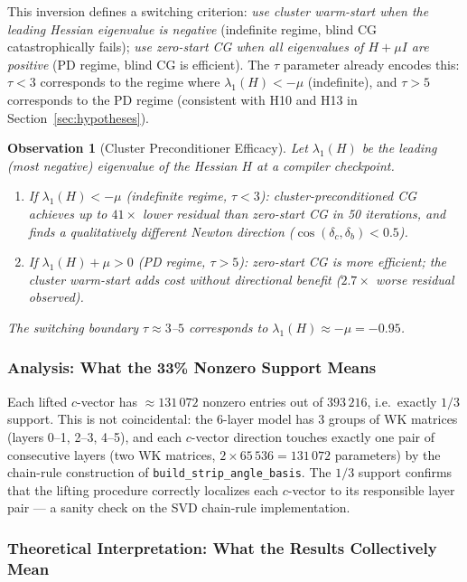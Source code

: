 \documentclass[11pt]{amsart}
\newtheorem{observation}[theorem]{Observation}
\begin{document}
This inversion defines a switching criterion:
\emph{use cluster warm-start when the leading Hessian eigenvalue
is negative} (indefinite regime, blind CG catastrophically fails);
\emph{use zero-start CG when all eigenvalues of $H + \mu I$ are positive}
(PD regime, blind CG is efficient).
The $\tau$ parameter already encodes this: $\tau < 3$ corresponds to
the regime where $\lambda_1(H) < -\mu$ (indefinite), and $\tau > 5$
corresponds to the PD regime (consistent with H10 and H13 in
Section~\ref{sec:hypotheses}).

\begin{observation}[Cluster Preconditioner Efficacy]
\label{thm:cluster_precond}
Let $\lambda_1(H)$ be the leading (most negative) eigenvalue of the
Hessian $H$ at a compiler checkpoint.
\begin{enumerate}
\item If $\lambda_1(H) < -\mu$ (indefinite regime, $\tau < 3$):
  cluster-preconditioned CG achieves up to $41\times$ lower residual
  than zero-start CG in 50 iterations, and finds a qualitatively
  different Newton direction ($\cos(\delta_c, \delta_b) < 0.5$).
\item If $\lambda_1(H) + \mu > 0$ (PD regime, $\tau > 5$):
  zero-start CG is more efficient; the cluster warm-start adds cost
  without directional benefit ($2.7\times$ worse residual observed).
\end{enumerate}
The switching boundary $\tau \approx 3$--$5$ corresponds to
$\lambda_1(H) \approx -\mu = -0.95$.
\end{observation}

\subsubsection*{Analysis: What the 33\% Nonzero Support Means}

Each lifted $c$-vector has $\approx 131\,072$ nonzero entries out of
$393\,216$, i.e.\ exactly $1/3$ support.
This is not coincidental: the 6-layer model has 3 groups of WK matrices
(layers 0--1, 2--3, 4--5), and each $c$-vector direction touches exactly
one pair of consecutive layers (two WK matrices, $2 \times 65\,536 = 131\,072$
parameters) by the chain-rule construction of \texttt{build\_strip\_angle\_basis}.
The $1/3$ support confirms that the lifting procedure correctly
localizes each $c$-vector to its responsible layer pair --- a sanity
check on the SVD chain-rule implementation.

\subsubsection*{Theoretical Interpretation: What the Results Collectively Mean}
\end{document}

